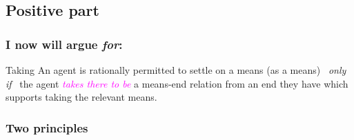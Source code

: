 \documentclass[noamssymb, compress, handout]{beamer} %
\begin{document}
\subsection{Positive part}
\label{sec:positive}

\begin{frame}
  \frametitle{I now will argue \emph{for}:}

  \begin{block}{Taking}
    An agent is rationally permitted to settle on a means (as a means)
    \newline
    \mbox{ }\hfill\emph{only if}\hfill\mbox{ }
    \newline
    the agent \textcolor{fuchsia}{\emph{takes there to be}} a means-end relation from an end they have which supports taking the relevant means.
  \end{block}
\end{frame}

\subsubsection{Two principles}
\label{sec:two-principles}
\end{document}
